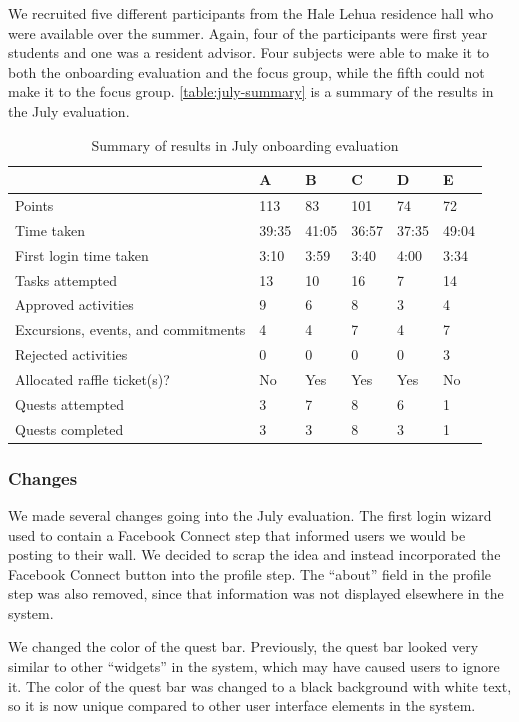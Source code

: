 We recruited five different participants from the Hale Lehua residence hall who were available over the summer. Again, four of the participants were first year students and one was a resident advisor. Four subjects were able to make it to both the onboarding evaluation and the focus group, while the fifth could not make it to the focus group. \autoref{table:july-summary} is a summary of the results in the July evaluation.

\begin{table}[t]
	\begin{tabular}{| l || p{1cm} | p{1cm} | p{1cm} | p{1cm} | p{1cm} |}
		\hline
		& A & B & C & D & E \\
		\hline
		Points & 113 & 83 & 101 & 74 & 72 \\
    Time taken & 39:35 & 41:05 & 36:57 & 37:35 & 49:04 \\
    First login time taken & 3:10 & 3:59 & 3:40 & 4:00 & 3:34 \\
    Tasks attempted & 13 & 10 & 16 & 7 & 14 \\
    Approved activities & 9 & 6 & 8 & 3 & 4 \\
    Excursions, events, and commitments & 4 & 4 & 7 & 4 & 7 \\
    Rejected activities & 0 & 0 & 0 & 0 & 3 \\
    Allocated raffle ticket(s)? & No & Yes & Yes & Yes & No \\
    Quests attempted & 3 & 7 & 8 & 6 & 1 \\
    Quests completed & 3 & 3 & 8 & 3 & 1 \\
		\hline
	\end{tabular}
	\caption{Summary of results in July onboarding evaluation}
	\label{table:july-summary}
\end{table}

\subsubsection{Changes}

We made several changes going into the July evaluation. The first login wizard used to contain a Facebook Connect step that informed users we would be posting to their wall. We decided to scrap the idea and instead incorporated the Facebook Connect button into the profile step. The ``about'' field in the profile step was also removed, since that information was not displayed elsewhere in the system.

We changed the color of the quest bar. Previously, the quest bar looked very similar to other ``widgets'' in the system, which may have caused users to ignore it. The color of the quest bar was changed to a black background with white text, so it is now unique compared to other user interface elements in the system.


